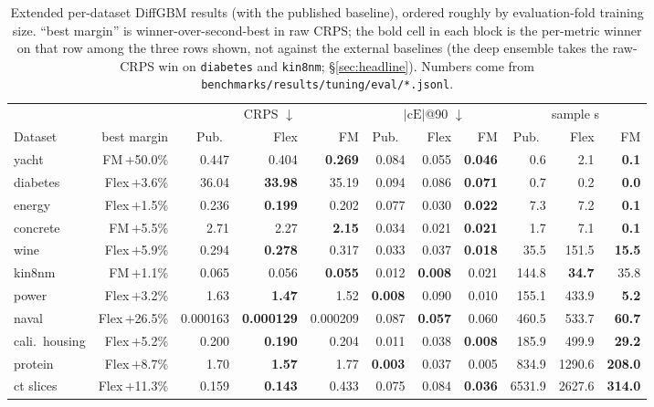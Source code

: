 \documentclass{article}
\begin{document}
\begin{table}[!h]
  \centering
  \caption{Extended per-dataset DiffGBM results (with the published baseline), ordered roughly by evaluation-fold training size. ``best margin'' is winner-over-second-best in raw CRPS; the bold cell in each block is the per-metric winner on that row among the three rows shown, not against the external baselines (the deep ensemble takes the raw-CRPS win on \texttt{diabetes} and \texttt{kin8nm}; \S\ref{sec:headline}). Numbers come from \texttt{benchmarks/results/tuning/eval/*.jsonl}.}\label{tab:perdata-ext}
  \scriptsize
  \begin{tabular}{lrrrrrrrrrr}
    \toprule
    & & \multicolumn{3}{c}{CRPS $\downarrow$} & \multicolumn{3}{c}{$|\text{cE}|$@90 $\downarrow$} & \multicolumn{3}{c}{sample s} \\
    \cmidrule(lr){3-5} \cmidrule(lr){6-8} \cmidrule(lr){9-11}
    Dataset & best margin & Pub.\ & Flex & FM & Pub.\ & Flex & FM & Pub.\ & Flex & FM \\
    \midrule
    yacht            & FM\,$+$50.0\% & 0.447 & 0.404 & \textbf{0.269} & 0.084 & 0.055 & \textbf{0.046} & 0.6 & 2.1 & \textbf{0.1} \\
    diabetes         & Flex\,$+$3.6\% & 36.04 & \textbf{33.98} & 35.19 & 0.094 & 0.086 & \textbf{0.071} & 0.7 & 0.2 & \textbf{0.0} \\
    energy           & Flex\,$+$1.5\% & 0.236 & \textbf{0.199} & 0.202 & 0.077 & 0.030 & \textbf{0.022} & 7.3 & 7.2 & \textbf{0.1} \\
    concrete         & FM\,$+$5.5\% & 2.71 & 2.27 & \textbf{2.15} & 0.034 & 0.021 & \textbf{0.021} & 1.7 & 7.1 & \textbf{0.1} \\
    wine             & Flex\,$+$5.9\% & 0.294 & \textbf{0.278} & 0.317 & 0.033 & 0.037 & \textbf{0.018} & 35.5 & 151.5 & \textbf{15.5} \\
    kin8nm           & FM\,$+$1.1\% & 0.065 & 0.056 & \textbf{0.055} & 0.012 & \textbf{0.008} & 0.021 & 144.8 & \textbf{34.7} & 35.8 \\
    power            & Flex\,$+$3.2\% & 1.63 & \textbf{1.47} & 1.52 & \textbf{0.008} & 0.090 & 0.010 & 155.1 & 433.9 & \textbf{5.2} \\
    naval            & Flex\,$+$26.5\% & 0.000163 & \textbf{0.000129} & 0.000209 & 0.087 & \textbf{0.057} & 0.060 & 460.5 & 533.7 & \textbf{60.7} \\
    cali.\ housing   & Flex\,$+$5.2\% & 0.200 & \textbf{0.190} & 0.204 & 0.011 & 0.038 & \textbf{0.008} & 185.9 & 499.9 & \textbf{29.2} \\
    protein          & Flex\,$+$8.7\% & 1.70 & \textbf{1.57} & 1.77 & \textbf{0.003} & 0.037 & 0.005 & 834.9 & 1290.6 & \textbf{208.0} \\
    ct slices        & Flex\,$+$11.3\% & 0.159 & \textbf{0.143} & 0.433 & 0.075 & 0.084 & \textbf{0.036} & 6531.9 & 2627.6 & \textbf{314.0} \\
    \bottomrule
  \end{tabular}
\end{table}
\end{document}
